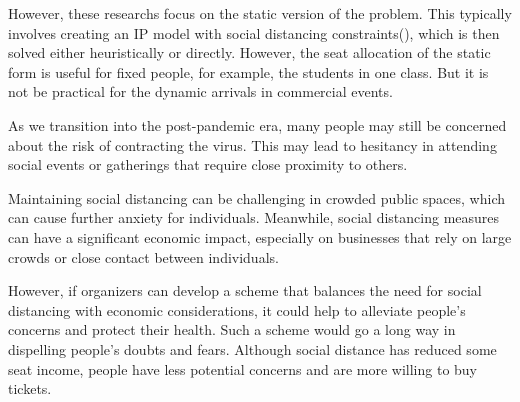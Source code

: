 




However, these researchs focus on the static version of the problem. This typically involves creating an IP model with social distancing constraints(\cite{bortolete2022support, ghorbani2020model, haque2022optimization}), which is then solved either heuristically or directly. However, the seat allocation of the static form is useful for fixed people, for example, the students in one class. 
But it is not be practical for the dynamic arrivals in commercial events.


As we transition into the post-pandemic era, many people may still be concerned about the risk of contracting the virus. This may lead to hesitancy in attending social events or gatherings that require close proximity to others.

Maintaining social distancing can be challenging in crowded public spaces, which can cause further anxiety for individuals. Meanwhile, social distancing measures can have a significant economic impact, especially on businesses that rely on large crowds or close contact between individuals.

However, if organizers can develop a scheme that balances the need for social distancing with economic considerations, it could help to alleviate people's concerns and protect their health. Such a scheme would go a long way in dispelling people's doubts and fears. Although social distance has reduced some seat income, people have less potential concerns and are more willing to buy tickets.



